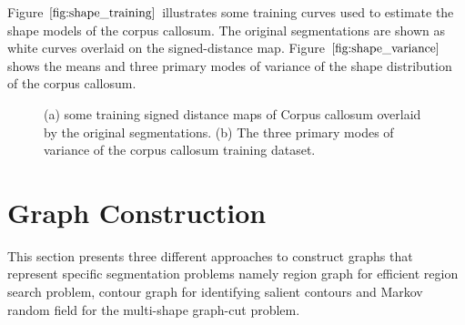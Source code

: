 \documentclass{SMBV13}
\begin{document}
Figure $\ref{fig:shape_training}$ illustrates some training curves used to estimate the shape models of the corpus callosum. The original segmentations are shown as white curves overlaid on the signed-distance map. Figure $\ref{fig:shape_variance}$ shows the means and three primary modes of variance of the shape distribution of the corpus callosum.

\begin{figure}[htbp]
    \centering
    \caption{(a) some training signed distance maps of Corpus callosum overlaid by the original segmentations. (b) The three primary modes of variance of the corpus callosum training dataset.}
\end{figure}

\section{Graph Construction}
\label{sec:graph_cunstruction}
This section presents three different approaches to construct graphs that represent specific segmentation problems namely region graph for efficient region search problem, contour graph for identifying salient contours and Markov random field for the multi-shape graph-cut problem.
\end{document}
